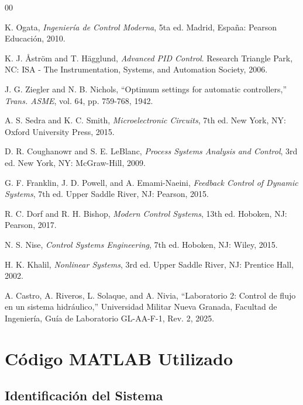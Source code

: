 \documentclass[conference]{IEEEtran}
\begin{document}
\begin{thebibliography}{00}

K. Ogata, \emph{Ingeniería de Control Moderna}, 5ta ed. Madrid, España: Pearson Educación, 2010.

K. J. Åström and T. Hägglund, \emph{Advanced PID Control}. Research Triangle Park, NC: ISA - The Instrumentation, Systems, and Automation Society, 2006.

J. G. Ziegler and N. B. Nichols, ``Optimum settings for automatic controllers,'' \emph{Trans. ASME}, vol. 64, pp. 759-768, 1942.

A. S. Sedra and K. C. Smith, \emph{Microelectronic Circuits}, 7th ed. New York, NY: Oxford University Press, 2015.

D. R. Coughanowr and S. E. LeBlanc, \emph{Process Systems Analysis and Control}, 3rd ed. New York, NY: McGraw-Hill, 2009.

G. F. Franklin, J. D. Powell, and A. Emami-Naeini, \emph{Feedback Control of Dynamic Systems}, 7th ed. Upper Saddle River, NJ: Pearson, 2015.

R. C. Dorf and R. H. Bishop, \emph{Modern Control Systems}, 13th ed. Hoboken, NJ: Pearson, 2017.

N. S. Nise, \emph{Control Systems Engineering}, 7th ed. Hoboken, NJ: Wiley, 2015.

H. K. Khalil, \emph{Nonlinear Systems}, 3rd ed. Upper Saddle River, NJ: Prentice Hall, 2002.

A. Castro, A. Riveros, L. Solaque, and A. Nivia, ``Laboratorio 2: Control de flujo en un sistema hidráulico,'' Universidad Militar Nueva Granada, Facultad de Ingeniería, Guía de Laboratorio GL-AA-F-1, Rev. 2, 2025.

\end{thebibliography}

\appendix

\section{Código MATLAB Utilizado}

\subsection{Identificación del Sistema}
\end{document}
